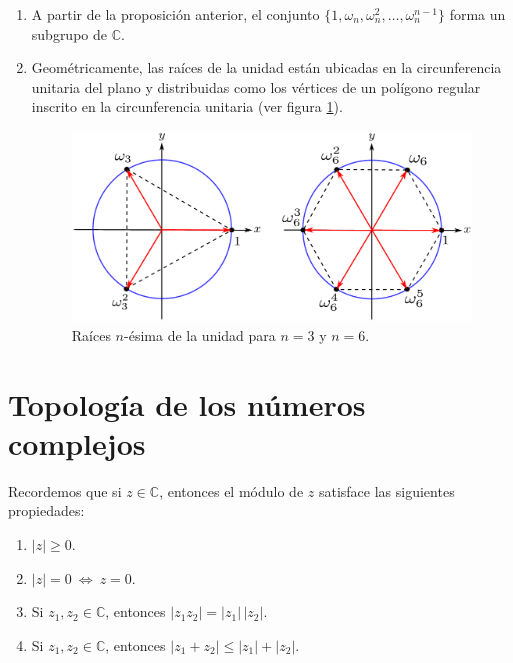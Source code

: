 \begin{enumerate}
\item A partir de la proposición anterior, el conjunto $ \{1, \omega_n, \omega_n^2, \dots, \omega_n^{n-1}\}$ forma un subgrupo de $\mathbb{C}$.

\item Geométricamente, las raíces de la unidad están ubicadas en la circunferencia unitaria del plano y distribuidas como los vértices de un polígono regular inscrito en la circunferencia unitaria (ver figura \ref{RaizUno}).

\begin{figure}[H]
    \centering
    \includegraphics[scale=0.5]{Figuras/RaizUnidad.pdf}
    \caption{Raíces $n$-ésima de la unidad para $n = 3$ y $n = 6$.}
    \label{RaizUno}
\end{figure}

\end{enumerate}

\section{Topología de los números complejos}

 Recordemos que si $z \in \mathbb{C}$, entonces el módulo de $z$ satisface las siguientes propiedades:

\begin{enumerate}
\item $|z| \geq 0$.

\item $ |z| = 0 ~\Leftrightarrow~ z = 0$.

\item Si $z_1, z_2 \in \mathbb{C}$, entonces $|z_1 z_2| = |z_1|\, |z_2|$.

\item Si $z_1, z_2 \in \mathbb{C}$, entonces $|z_1 + z_2| \leq |z_1| + |z_2|$.
\end{enumerate}

